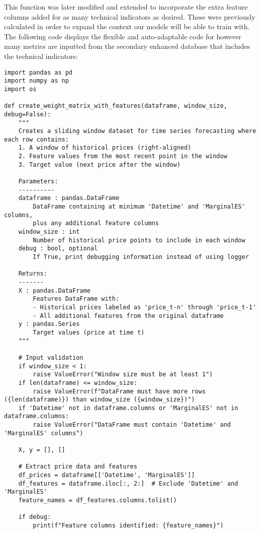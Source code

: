 \documentclass[12pt]{report} %
\begin{document}
This function was later modified and extended to incorporate the extra feature columns added for as many technical indicators as desired. These were previously calculated in order to expand the context our models will be able to train with. The following code displays the flexible and auto-adaptable code for however many metrics are inputted from the secondary enhanced database that includes the technical indicators:
\begin{lstlisting}
import pandas as pd
import numpy as np
import os

def create_weight_matrix_with_features(dataframe, window_size, debug=False):
    """
    Creates a sliding window dataset for time series forecasting where each row contains:
    1. A window of historical prices (right-aligned)
    2. Feature values from the most recent point in the window
    3. Target value (next price after the window)
    
    Parameters:
    ----------
    dataframe : pandas.DataFrame
        DataFrame containing at minimum 'Datetime' and 'MarginalES' columns, 
        plus any additional feature columns
    window_size : int
        Number of historical price points to include in each window
    debug : bool, optional
        If True, print debugging information instead of using logger
        
    Returns:
    -------
    X : pandas.DataFrame
        Features DataFrame with:
        - Historical prices labeled as 'price_t-n' through 'price_t-1'
        - All additional features from the original dataframe
    y : pandas.Series
        Target values (price at time t)
    """
    
    # Input validation
    if window_size < 1:
        raise ValueError("Window size must be at least 1")
    if len(dataframe) <= window_size:
        raise ValueError(f"DataFrame must have more rows ({len(dataframe)}) than window_size ({window_size})")
    if 'Datetime' not in dataframe.columns or 'MarginalES' not in dataframe.columns:
        raise ValueError("DataFrame must contain 'Datetime' and 'MarginalES' columns")
    
    X, y = [], []
    
    # Extract price data and features
    df_prices = dataframe[['Datetime', 'MarginalES']]
    df_features = dataframe.iloc[:, 2:]  # Exclude 'Datetime' and 'MarginalES'
    feature_names = df_features.columns.tolist()
    
    if debug:
        print(f"Feature columns identified: {feature_names}")
    

\end{lstlisting}
\end{document}
